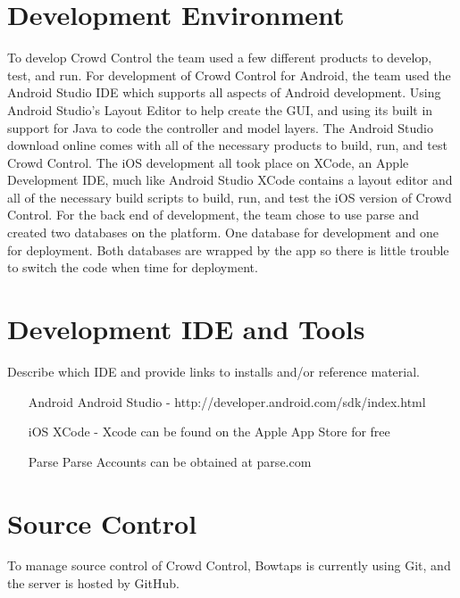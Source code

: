\section{Development Environment}

To develop Crowd Control the team used a few different products to develop, test, and run.  For development of Crowd Control for Android, the team used the Android Studio IDE which supports all aspects of Android development.  Using Android Studio's Layout Editor to help create the GUI, and using its built in support for Java to code the controller and model layers. The Android Studio download online comes with all of the necessary products to build, run, and test Crowd Control. The iOS development all took place on XCode, an Apple Development IDE, much like Android Studio XCode contains a layout editor and all of the necessary build scripts to build, run, and test the iOS version of Crowd Control.  For the back end of development, the team chose to use parse and created two databases on the platform.  One database for development and one for deployment.  Both databases are wrapped by the app so there is little trouble to switch the code when time for deployment.

\section{Development IDE and Tools}
Describe which IDE and provide links to installs and/or reference material. 
\begin{itemize}
\item[Android]
	Android Studio - http://developer.android.com/sdk/index.html
\item[iOS]
	XCode - Xcode can be found on the Apple App Store for free
\item[Parse]
	Parse Accounts can be obtained at parse.com
\end{itemize}

\section{Source Control}
To manage source control of Crowd Control, Bowtaps is currently using Git, and the server is hosted by GitHub.

